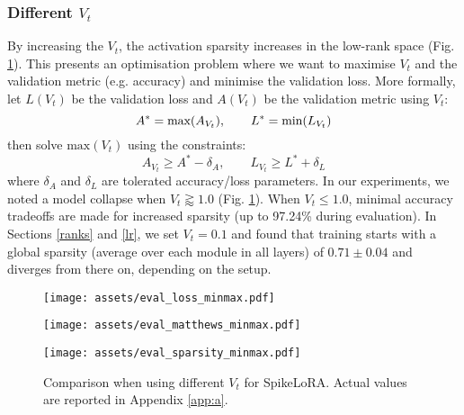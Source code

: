 \documentclass{article} %
\begin{document}
\subsubsection{Different \(V_t\)}
By increasing the \(V_t\), the activation sparsity increases in the low-rank space (Fig. \ref{fig:v_threshold}). This presents an optimisation problem where we want to maximise \(V_t\) and the validation metric (e.g. accuracy) and minimise the validation loss. More formally, let \(L(V_t)\) be the validation loss and \(A(V_t)\) be the validation metric using \(V_t\):
\begin{equation}
  A^* = \text{max}(A_{V_t}), \qquad L^* = \text{min}(L_{V_t}) \\
\end{equation}
then solve \(\text{max}(V_t)\) using the constraints:
\begin{equation}
  A_{V_t} \geq A^* - \delta_A, \qquad L_{V_t} \geq L^* + \delta_L
\end{equation}
where \(\delta_A\) and \(\delta_L\) are tolerated accuracy/loss parameters. In our experiments, we noted a model collapse when \(V_t \gtrapprox 1.0\) (Fig. \ref{fig:v_threshold}). When \(V_t \leq 1.0\), minimal accuracy tradeoffs are made for increased sparsity (up to 97.24\% during evaluation). In Sections \ref{ranks} and \ref{lr}, we set \(V_t = 0.1\) and found that training starts with a global sparsity (average over each module in all layers) of \(0.71\pm 0.04\) and diverges from there on, depending on the setup.
\begin{figure}[htbp]
  \centering
  \begin{minipage}{0.32\textwidth}
    \centering
    \texttt{[image: assets/eval\_loss\_minmax.pdf]}
  \end{minipage}
  \hfill
  \begin{minipage}{0.32\textwidth}
    \centering
    \texttt{[image: assets/eval\_matthews\_minmax.pdf]}
  \end{minipage}
  \hfill
  \begin{minipage}{0.32\textwidth}
    \centering
    \texttt{[image: assets/eval\_sparsity\_minmax.pdf]}
  \end{minipage}
  \caption{Comparison when using different \(V_t\) for SpikeLoRA. Actual values are reported in Appendix \ref{app:a}.}
  \label{fig:v_threshold}
\end{figure}
\end{document}
